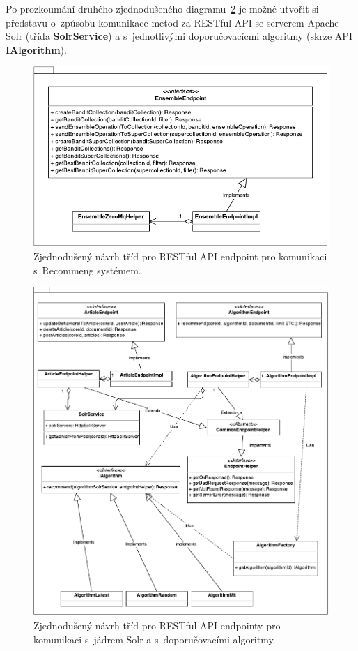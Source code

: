 \documentclass[thesis=M,czech]{FITthesis}[2014/05/07]
\begin{document}
Po prozkoumání druhého zjednodušeného diagramu~\ref{fig:recommengRestNavrh2} je možné utvořit si představu o~způsobu komunikace metod za RESTful API se serverem Apache Solr (třída \textbf{SolrService}) a s~jednotlivými doporučovacícmi algoritmy (skrze API \textbf{IAlgorithm}).

\begin{figure}\centering
	\includegraphics[width=1.0\textwidth]{obr/rest1.pdf}
 	\caption[Zjednodušený návrh tříd pro RESTful API endpoint pro komunikaci s~Recommeng systémem.]{Zjednodušený návrh tříd pro RESTful API endpoint pro komunikaci s~Recommeng systémem.}\label{fig:recommengRestNavrh}
\end{figure}	

\begin{figure}\centering
	\includegraphics[width=1.0\textwidth]{obr/rest2.pdf}
 	\caption[Zjednodušený návrh tříd pro RESTful API endpointy pro komunikaci s~jádrem Solr a s~doporučovacími algoritmy.]{Zjednodušený návrh tříd pro RESTful API endpointy pro komunikaci s~jádrem Solr a s~doporučovacími algoritmy.}\label{fig:recommengRestNavrh2}
\end{figure}	
\end{document}
